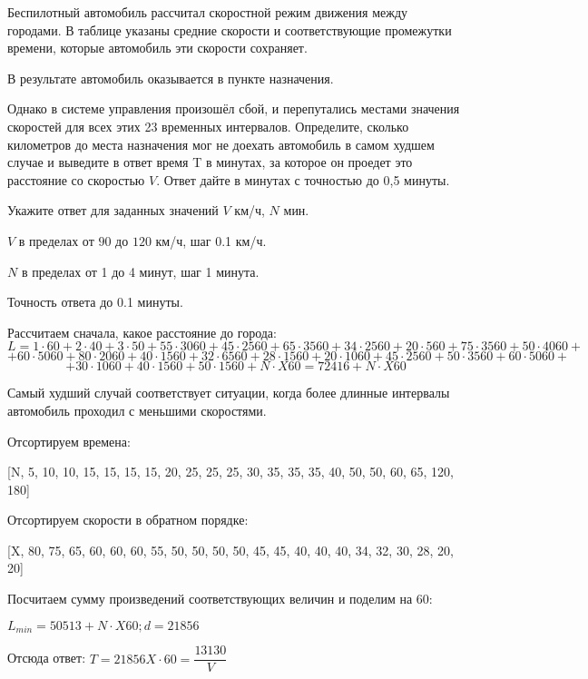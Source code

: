 Беспилотный
автомобиль рассчитал скоростной режим движения между городами. В таблице указаны средние скорости и соответствующие промежутки времени, которые автомобиль эти скорости сохраняет.


В результате автомобиль оказывается в пункте назначения.

Однако в системе
управления произошёл сбой, и перепутались местами значения
скоростей для всех этих 23 временных интервалов. 
Определите, сколько километров до места назначения мог не доехать
автомобиль в самом худшем случае и выведите в ответ время T в минутах, за которое он проедет это расстояние со скоростью $V$. Ответ дайте в минутах с точностью до 0,5 минуты.

Укажите ответ для заданных значений $V$ км/ч, $N$ мин.

\paramSection

$V$ в пределах от $90$ до $120$ км/ч, шаг  0.1 км/ч.  

$N$ в пределах от 1 до 4 минут, шаг  1 минута.

Точность ответа  до  0.1 минуты.

\soultionSection

Рассчитаем сначала, какое расстояние до города:
$$L=1 \cdot 60 +2 \cdot 40+ 3 \cdot 50+ 55 \cdot 3060+45 \cdot 2560+ 65 \cdot 3560+ 34 \cdot 2560+ 20 \cdot 560+ 75 \cdot 3560+ 50 \cdot 4060+$$
$$+ 60 \cdot 5060+80 \cdot 2060+40 \cdot 1560+ 32 \cdot 6560+ 28 \cdot 1560+20 \cdot 1060+ 45 \cdot 2560+ 50 \cdot 3560+ 60 \cdot 5060+$$
$$+30 \cdot 1060+40 \cdot 1560+50 \cdot 1560+N \cdot X60=72416+N \cdot X60$$  

Самый худший случай соответствует ситуации, когда более длинные интервалы автомобиль проходил с меньшими скоростями.

Отсортируем времена:

[N, 5, 10, 10, 15, 15, 15, 15, 20, 25, 25, 25, 30, 35, 35, 35, 40, 50, 50, 60, 65, 120, 180]

Отсортируем скорости в обратном порядке:

[X, 80, 75, 65, 60, 60, 60, 55, 50, 50, 50, 50, 45, 45, 40, 40, 40, 34, 32, 30, 28, 20, 20] 

Посчитаем сумму произведений соответствующих величин и поделим на 60:

$L_{min}=50513+N \cdot X60  ;  d=21856$

Отсюда ответ: $ T=21856 X \cdot 60= \dfrac{13130}{V}$

